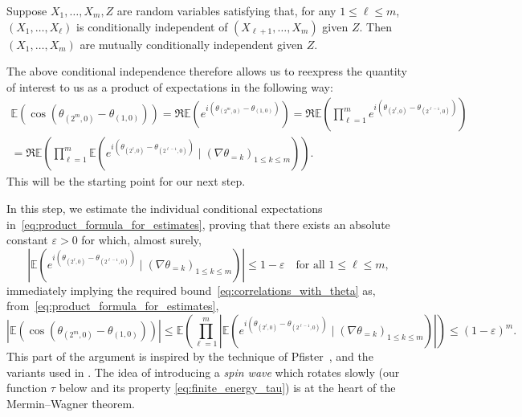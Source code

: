 \documentclass[12pt,reqno]{article}
\def\E{\mathbb{E}}
\def\eps{\varepsilon}
\begin{document}
\medbreak
{} Suppose $X_1,\dots,X_m,Z$ are random variables
satisfying that, for any $1 \le \ell \le m$, $(X_1,\dots,X_\ell)$ is conditionally independent of $(X_{\ell+1},\dots,X_m)$ given $Z$.
Then $(X_1,\dots,X_m)$ are mutually conditionally independent given $Z$.
\medbreak

The above conditional independence therefore allows us to reexpress the quantity of interest to us as a product of expectations in the following way:
\begin{multline}\label{eq:product_formula_for_estimates}
\E(\cos(\theta_{(2^m,0)}-\theta_{(1,0)}))
 = \Re\E\left(e^{i\left(\theta_{(2^m,0)}-\theta_{(1,0)}\right)}\right)
 = \Re\E\left(\prod_{\ell=1}^m e^{i\left(\theta_{(2^\ell,0)}-\theta_{(2^{\ell-1},0)}\right)} \right) \\
 = \Re\E\left( \prod_{\ell=1}^m \E\left(e^{i\left(\theta_{(2^\ell,0)}-\theta_{(2^{\ell-1},0)}\right)} \mid (\nabla\theta_{=k})_{1 \le k \le m} \right)\right) .
\end{multline}
This will be the starting point for our next step.




\medbreak
{} In this step, we estimate the individual conditional expectations in~\eqref{eq:product_formula_for_estimates}, proving that there exists an absolute constant $\eps>0$ for which, almost surely,
\begin{equation}\label{eq:fluctuations_of_gradient}
	\left|\E\left(e^{i\left(\theta_{(2^\ell,0)}-\theta_{(2^{\ell-1},0)}\right)} \mid (\nabla\theta_{=k})_{1 \le k \le m} \right)\right| \le
	1-\eps\quad\text{for all $1\le \ell\le m$},
\end{equation}
immediately implying the required bound~\eqref{eq:correlations_with_theta} as, from~\eqref{eq:product_formula_for_estimates},
\[ \left|\E(\cos(\theta_{(2^m,0)}-\theta_{(1,0)}))\right|
	\le \E\left( \prod_{\ell=1}^m \left| \E\left(e^{i\left(\theta_{(2^\ell,0)}-\theta_{(2^{\ell-1},0)}\right)} \mid (\nabla\theta_{=k})_{1 \le k \le m} \right) \right| \right) \le (1-\eps)^m .\]
This part of the argument is inspired by the technique of Pfister~\cite{pfister1981symmetry}, and the variants used in \cite{richthammer2007translation, milos2015delocalization}. The idea of introducing a \emph{spin wave} which rotates
slowly (our function $\tau$ below and its property
\eqref{eq:finite_energy_tau}) is at the heart of the Mermin--Wagner
theorem.
\end{document}
